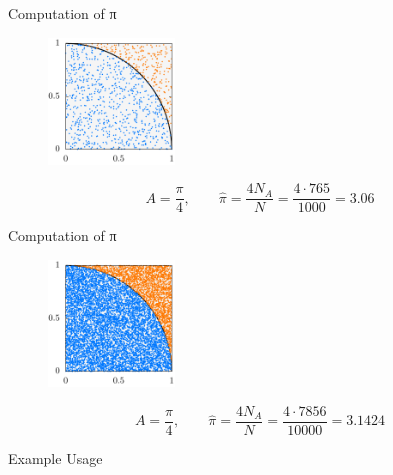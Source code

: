 \documentclass[aspectratio=169]{beamer}
\newcommand{\inputCodeBlock}[1]{%
    \begin{center}
        
    \end{center}
}
\begin{document}
    \begin{frame}{Computation of π}
      \begin{figure}
        \includegraphics[width=0.3\textwidth]{figures/monte_carlo_pi_1000_765.pdf}
      \end{figure}
      \begin{mybox}
        \[
          A = \frac{π}{4}, \qquad \hat{π} = \frac{4 N_A}{N} = \frac{4 \cdot 765}{1000} = 3.06
        \]
      \end{mybox}
    \end{frame}

    \begin{frame}{Computation of π}
      \begin{figure}
        \includegraphics[width=0.3\textwidth]{figures/monte_carlo_pi_10000_7856.pdf}
      \end{figure}
      \begin{mybox}
        \[
          A = \frac{π}{4}, \qquad \hat{π} = \frac{4 N_A}{N} = \frac{4 \cdot 7856}{10000} = 3.1424
        \]
      \end{mybox}
    \end{frame}

    \begin{frame}{Example Usage}
      \hspace{8em}
      \begin{minipage}[c]{0.7\textwidth}
        \inputCodeBlock{code/monte_carlo_pi.cpp}
      \end{minipage}
    \end{frame}
\end{document}
